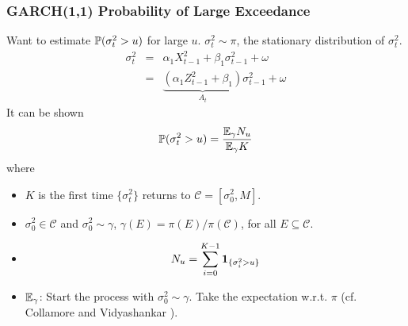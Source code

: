 \documentclass{beamer}
\begin{document}
\begin{frame}
  \frametitle{GARCH(1,1) Probability of Large Exceedance}
    Want to estimate $\P(\sigma_t^2 > u)$ for large $u$. $\sigma_t^2
  \sim \pi$, the stationary distribution of $\sigma_t^2$.
  \begin{eqnarray*}
    \sigma_t^2
    &=&
    \alpha_1 X_{t-1}^2 + \beta_1 \sigma_{t-1}^2 + \omega \\
    &=&
    \underbrace{
      (\alpha_1 Z_{t-1}^2 + \beta_1)
    }_{A_t}  \sigma_{t-1}^2 + \omega
  \end{eqnarray*}
  It can be shown
   \[
   \P(\sigma^2_t > u) = {
     \E_\gamma N_u
     \over
     \E_\gamma K
   }
   \]
   where
   \begin{footnotesize}
     \begin{itemize}
     \item $K$ is the first time $\{\sigma_t^2\}$ returns to $\mathcal C = [\sigma_0^2, M]$.
     \item $\sigma_0^2 \in \mathcal C$ and $\sigma_0^2 \sim \gamma$,
       $\gamma(E) = \pi(E) / \pi(\mathcal C)$, for all
       $E \subseteq \mathcal C$.
     \item
       \[
       N_u = \sum_{i=0}^{K - 1} \1{\sigma^2_i > u}
       \]
     \item $\E_\gamma$: Start the process with $\sigma_0^2 \sim
       \gamma$. Take the expectation w.r.t. $\pi$ (cf.  Collamore and
       Vidyashankar \cite{Collamore20133378}).
     \end{itemize}
   \end{footnotesize}
 \end{frame}

\end{document}
